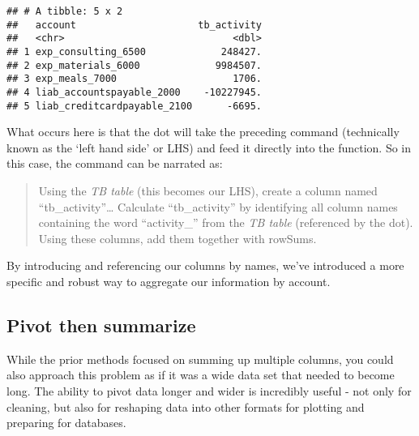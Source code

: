 \documentclass[
]{book}
\newenvironment{Shaded}{\begin{snugshade}}{\end{snugshade}}
\newcommand{\CommentTok}[1]{\textcolor[rgb]{0.56,0.35,0.01}{\textit{#1}}}
\newcommand{\DataTypeTok}[1]{\textcolor[rgb]{0.13,0.29,0.53}{#1}}
\newcommand{\KeywordTok}[1]{\textcolor[rgb]{0.13,0.29,0.53}{\textbf{#1}}}
\newcommand{\NormalTok}[1]{#1}
\newcommand{\OperatorTok}[1]{\textcolor[rgb]{0.81,0.36,0.00}{\textbf{#1}}}
\newcommand{\StringTok}[1]{\textcolor[rgb]{0.31,0.60,0.02}{#1}}
\begin{document}
\begin{Shaded}
\end{Shaded}

\begin{verbatim}
## # A tibble: 5 x 2
##   account                     tb_activity
##   <chr>                             <dbl>
## 1 exp_consulting_6500             248427.
## 2 exp_materials_6000             9984507.
## 3 exp_meals_7000                    1706.
## 4 liab_accountspayable_2000    -10227945.
## 5 liab_creditcardpayable_2100      -6695.
\end{verbatim}

What occurs here is that the dot will take the preceding command (technically known as the `left hand side' or LHS) and feed it directly into the function. So in this case, the command can be narrated as:

\begin{quote}
Using the \emph{TB table} (this becomes our LHS), create a column named ``tb\_activity''\ldots{} Calculate ``tb\_activity'' by identifying all column names containing the word ``activity\_'' from the \emph{TB table} (referenced by the dot). Using these columns, add them together with rowSums.
\end{quote}

By introducing and referencing our columns by names, we've introduced a more specific and robust way to aggregate our information by account.

\hypertarget{pivot-then-summarize}{%
\subsection{Pivot then summarize}\label{pivot-then-summarize}}

While the prior methods focused on summing up multiple columns, you could also approach this problem as if it was a wide data set that needed to become long. The ability to pivot data longer and wider is incredibly useful - not only for cleaning, but also for reshaping data into other formats for plotting and preparing for databases.
\end{document}
